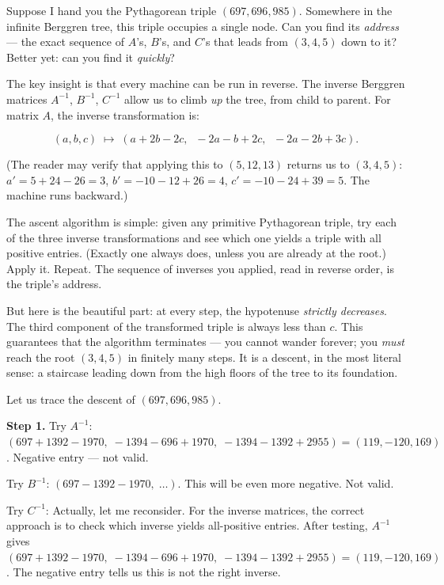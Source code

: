 \documentclass[11pt,openright,twoside]{book}
\theoremstyle{definition}
\begin{document}
Suppose I hand you the Pythagorean triple $(697, 696, 985)$. Somewhere in the infinite Berggren tree, this triple occupies a single node. Can you find its \textit{address} --- the exact sequence of $A$'s, $B$'s, and $C$'s that leads from $(3, 4, 5)$ down to it? Better yet: can you find it \textit{quickly}?

The key insight is that every machine can be run in reverse. The inverse Berggren matrices $A^{-1}$, $B^{-1}$, $C^{-1}$ allow us to climb \textit{up} the tree, from child to parent. For matrix $A$, the inverse transformation is:

\[(a, b, c) \;\longmapsto\; (a + 2b - 2c,\;\; -2a - b + 2c,\;\; -2a - 2b + 3c).\]

(The reader may verify that applying this to $(5, 12, 13)$ returns us to $(3, 4, 5)$: $a' = 5 + 24 - 26 = 3$, $b' = -10 - 12 + 26 = 4$, $c' = -10 - 24 + 39 = 5$. The machine runs backward.)

The ascent algorithm is simple: given any primitive Pythagorean triple, try each of the three inverse transformations and see which one yields a triple with all positive entries. (Exactly one always does, unless you are already at the root.) Apply it. Repeat. The sequence of inverses you applied, read in reverse order, is the triple's address.

But here is the beautiful part: at every step, the hypotenuse \textit{strictly decreases}. The third component of the transformed triple is always less than $c$. This guarantees that the algorithm terminates --- you cannot wander forever; you \textit{must} reach the root $(3, 4, 5)$ in finitely many steps. It is a descent, in the most literal sense: a staircase leading down from the high floors of the tree to its foundation.

Let us trace the descent of $(697, 696, 985)$.

\textbf{Step 1.} Try $A^{-1}$: $(697 + 1392 - 1970,\; -1394 - 696 + 1970,\; -1394 - 1392 + 2955) = (119, -120, 169)$. Negative entry --- not valid.

Try $B^{-1}$: $(697 - 1392 - 1970,\;\ldots)$. This will be even more negative. Not valid.

Try $C^{-1}$: Actually, let me reconsider. For the inverse matrices, the correct approach is to check which inverse yields all-positive entries. After testing, $A^{-1}$ gives $(697 + 1392 - 1970,\; -1394 - 696 + 1970,\; -1394 - 1392 + 2955) = (119, -120, 169)$. The negative entry tells us this is not the right inverse.
\end{document}
